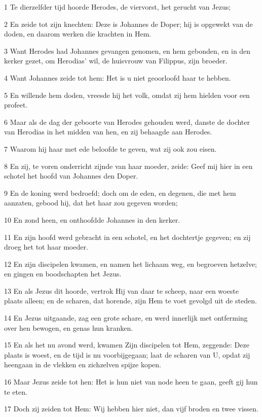 \par 1 Te dierzelfder tijd hoorde Herodes, de viervorst, het gerucht van Jezus;
\par 2 En zeide tot zijn knechten: Deze is Johannes de Doper; hij is opgewekt van de doden, en daarom werken die krachten in Hem.
\par 3 Want Herodes had Johannes gevangen genomen, en hem gebonden, en in den kerker gezet, om Herodias' wil, de huisvrouw van Filippus, zijn broeder.
\par 4 Want Johannes zeide tot hem: Het is u niet geoorloofd haar te hebben.
\par 5 En willende hem doden, vreesde hij het volk, omdat zij hem hielden voor een profeet.
\par 6 Maar als de dag der geboorte van Herodes gehouden werd, danste de dochter van Herodias in het midden van hen, en zij behaagde aan Herodes.
\par 7 Waarom hij haar met ede beloofde te geven, wat zij ook zou eisen.
\par 8 En zij, te voren onderricht zijnde van haar moeder, zeide: Geef mij hier in een schotel het hoofd van Johannes den Doper.
\par 9 En de koning werd bedroefd; doch om de eden, en degenen, die met hem aanzaten, gebood hij, dat het haar zou gegeven worden;
\par 10 En zond heen, en onthoofdde Johannes in den kerker.
\par 11 En zijn hoofd werd gebracht in een schotel, en het dochtertje gegeven; en zij droeg het tot haar moeder.
\par 12 En zijn discipelen kwamen, en namen het lichaam weg, en begroeven hetzelve; en gingen en boodschapten het Jezus.
\par 13 En als Jezus dit hoorde, vertrok Hij van daar te scheep, naar een woeste plaats alleen; en de scharen, dat horende, zijn Hem te voet gevolgd uit de steden.
\par 14 En Jezus uitgaande, zag een grote schare, en werd innerlijk met ontferming over hen bewogen, en genas hun kranken.
\par 15 En als het nu avond werd, kwamen Zijn discipelen tot Hem, zeggende: Deze plaats is woest, en de tijd is nu voorbijgegaan; laat de scharen van U, opdat zij heengaan in de vlekken en zichzelven spijze kopen.
\par 16 Maar Jezus zeide tot hen: Het is hun niet van node heen te gaan, geeft gij hun te eten.
\par 17 Doch zij zeiden tot Hem: Wij hebben hier niet, dan vijf broden en twee vissen.
